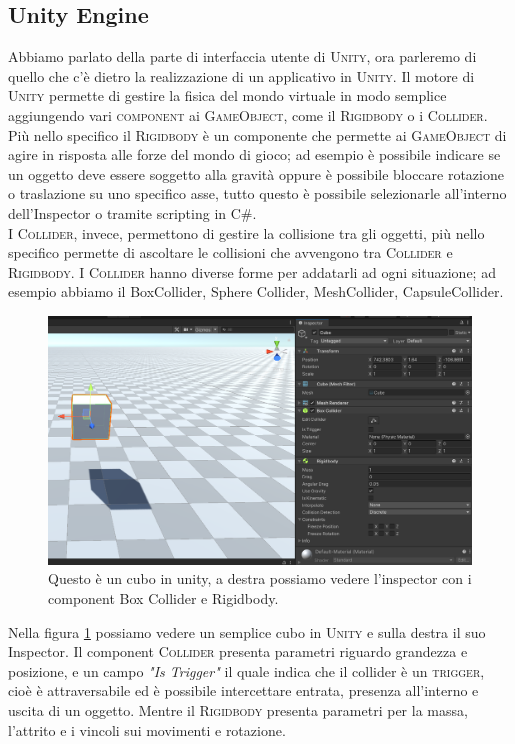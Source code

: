 \documentclass[12pt, openany]{book}
\begin{document}
	\subsection{Unity Engine}
	Abbiamo parlato della parte di interfaccia utente di \textsc{Unity}, ora parleremo di quello che c'è dietro la realizzazione di un applicativo in \textsc{Unity}.
	Il motore di \textsc{Unity} permette di gestire la fisica del mondo virtuale in modo semplice aggiungendo vari \textsc{component} ai \textsc{GameObject}, come il \textsc{Rigidbody} o i \textsc{Collider}. Più nello specifico il \textsc{Rigidbody} è un componente che permette ai \textsc{GameObject} di agire in risposta alle forze del mondo di gioco; ad esempio è possibile indicare se un oggetto deve essere soggetto alla gravità oppure è possibile bloccare rotazione o traslazione su uno specifico asse, tutto questo è possibile selezionarle all'interno dell'Inspector o tramite scripting in \textsc{C\#}.\\
	I \textsc{Collider}, invece, permettono di gestire la collisione tra gli oggetti, più nello specifico permette di ascoltare le collisioni che avvengono tra \textsc{Collider} e \textsc{Rigidbody}. I \textsc{Collider} hanno diverse forme per addatarli ad ogni situazione; ad esempio abbiamo il BoxCollider, Sphere Collider, MeshCollider, CapsuleCollider.
	\begin{figure}[H]
		\centering
		\includegraphics[width=0.8\linewidth]{"Immagini/RigidBody.png"}
		\caption{Questo è un cubo in unity, a destra possiamo vedere l'inspector con i component Box Collider e Rigidbody.}
		\label{fig:Rigidbody}
	\end{figure}
	Nella figura \ref{fig:Rigidbody} possiamo vedere un semplice cubo in \textsc{Unity} e sulla destra il suo Inspector. Il component \textsc{Collider} presenta parametri riguardo grandezza e posizione, e un campo \emph{"Is Trigger"} il quale indica che il collider è un \textsc{trigger}, cioè è attraversabile ed è possibile intercettare entrata, presenza all'interno e uscita di un oggetto. Mentre il \textsc{Rigidbody} presenta parametri per la massa, l'attrito e i vincoli sui movimenti e rotazione.
\end{document}
